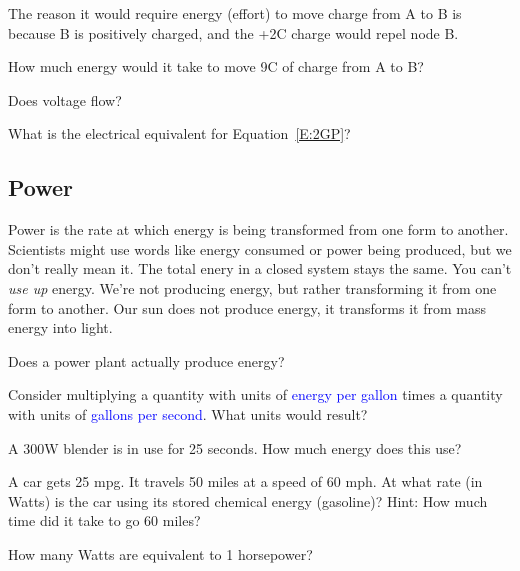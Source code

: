 The reason it would require energy (effort) to move charge from A to B is because B is positively charged, and the +2C charge would repel node B.
\par
\begin{blevel}
How much energy would it take to move 9C of charge from A to B?
\end{blevel}

\begin{alevel}
Does voltage flow?
\end{alevel}

\begin{blevel}
What is the electrical equivalent for Equation~\eqref{E:2GP}?
\end{blevel}

\subsection{Power}
Power is the rate at which energy is being transformed from one form to another. Scientists might use words like energy consumed or power being produced, but we don't really mean it. The total enery in a closed system stays the same. You can't \emph{use up} energy. We're not producing energy, but rather transforming it from one form to another. Our sun does not produce energy, it transforms it from mass energy into light.
\par
\begin{alevel}
Does a power plant actually produce energy?
\end{alevel}

\begin{alevel}
Consider multiplying a quantity with units of \textcolor{blue}{energy per gallon} times a quantity with units of \textcolor{blue}{gallons per second}. What units would result?
\end{alevel}

\begin{blevel}
A 300W blender is in use for 25 seconds. How much energy does this use?
\end{blevel}

\begin{clevel}
A car gets 25 mpg. It travels 50 miles at a speed of 60 mph. At what rate (in Watts) is the car using its stored chemical energy (gasoline)? Hint: How much time did it take to go 60 miles?
\end{clevel}

\begin{alevel}
How many Watts are equivalent to 1 horsepower?
\end{alevel}

